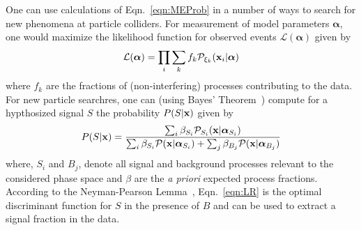 One can use calculations of Eqn.~\ref{eqn:MEProb} in a number of ways
to search for new phenomena at particle colliders. For measurement of
model parameters $\boldsymbol\alpha$, one would maximize the
likelihood function for observed events
$\mathcal{L}(\boldsymbol\alpha)$ given by
\begin{equation}
\mathcal{L}(\boldsymbol\alpha) = \prod_{i} \sum_{k} f_k \mathcal{P}_{\xi_k}({\bf x}_i|{\boldsymbol\alpha})
\label{eqn:LH}
\end{equation}
where $f_k$ are the fractions of (non-interfering) processes
contributing to the data. For new particle searchres, one can (using
Bayes' Theorem~\cite{Bayes01011763}) compute for a hypthosized signal
$S$ the probability $P(S|{\bf x})$ given by
\begin{equation}
P(S|{\bf x}) = \frac{\sum_{i} \beta_{S_i} \mathcal{P}_{S_i}({\bf x}|\boldsymbol\alpha_{S_i}) }{\sum_{i} \beta_{S_i} \mathcal{P}({\bf x}|\boldsymbol\alpha_{S_i}) + \sum_{j} \beta_{B_j} \mathcal{P}({\bf x}|\boldsymbol\alpha_{B_j})}
\label{eqn:LR}
\end{equation}
where, $S_i$ and $B_j$, denote all signal and background processes
relevant to the considered phase space and $\beta$ are the \emph{a
priori} expected process fractions. According to the Neyman-Pearson
Lemma~\cite{Neyman289}, Eqn.~\ref{eqn:LR} is the optimal discriminant
function for $S$ in the presence of $B$ and can be used to extract a
signal fraction in the data.


